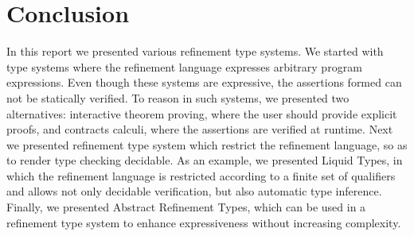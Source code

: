 \section{Conclusion}
In this report we presented various refinement type systems.
We started with type systems where the refinement language expresses arbitrary program expressions.
Even though these systems are expressive, the assertions formed can not be statically
verified. 
%
To reason in such systems, we presented two alternatives:
interactive theorem proving, where 
the user should provide explicit proofs, and 
contracts calculi, where 
the assertions are verified at runtime.
%
Next we presented refinement type system 
which restrict the refinement language, 
so as to render type checking decidable.
As an example, we presented Liquid Types, in which 
the refinement language is restricted according to a finite set of qualifiers
and allows not only decidable verification, but also automatic type inference.
Finally, we presented Abstract Refinement Types, which can be used
in a refinement type system to enhance expressiveness without increasing complexity.